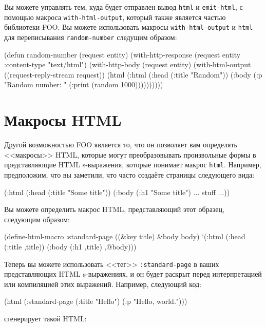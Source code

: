 Вы можете управлять тем, куда будет отправлен вывод \lstinline{html} и \lstinline{emit-html}, с
помощью макроса \lstinline{with-html-output}, который также является частью библиотеки
FOO. Вы можете использовать макросы \lstinline{with-html-output} и \lstinline{html} для
переписывания \lstinline{random-number} следущим образом:

\begin{myverb}
(defun random-number (request entity)
  (with-http-response (request entity :content-type "text/html")
    (with-http-body (request entity)
      (with-html-output ((request-reply-stream request))
        (html
          (:html
            (:head (:title "Random"))
            (:body
              (:p "Random number: " (:print (random 1000))))))))))
\end{myverb}

\section{Макросы HTML}

Другой возможностью FOO является то, что он позволяет вам определять <<макросы>>
HTML, которые могут преобразовывать произвольные формы в представляющие HTML s-выражения,
которые понимает макрос \lstinline{html}. Например, предположим, что вы заметили, что часто
создаёте страницы следующего вида:

\begin{myverb}
(:html
  (:head (:title "Some title"))
  (:body
    (:h1 "Some title")
    ... stuff ...))
\end{myverb}

Вы можете определить макрос HTML, представляющий этот образец, следующим образом:

\begin{myverb}
(define-html-macro :standard-page ((&key title) &body body)
  `(:html
     (:head (:title ,title))
     (:body
      (:h1 ,title)
      ,@body)))
\end{myverb}

Теперь вы можете использовать <<тег>> \lstinline{:standard-page} в ваших представляющих HTML
s-выражениях, и он будет раскрыт перед интерпретацией или компиляцией этих выражений.
Например, следующий код:

\begin{myverb}
(html (:standard-page (:title "Hello") (:p "Hello, world.")))
\end{myverb}

\noindent{}сгенерирует такой HTML:

